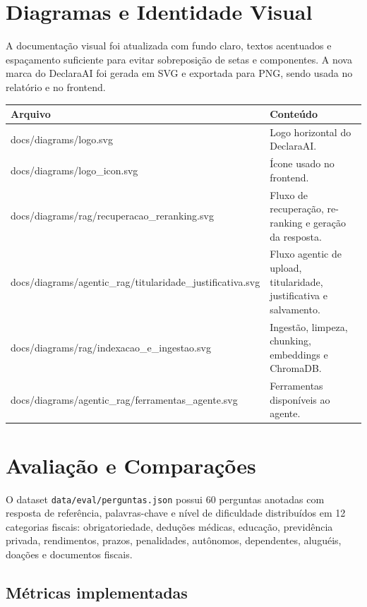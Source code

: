 \documentclass[11pt,a4paper,oneside]{article}
\begin{document}
\section{Diagramas e Identidade Visual}

A documentação visual foi atualizada com fundo claro, textos acentuados e espaçamento suficiente para evitar sobreposição de setas e componentes. A nova marca do DeclaraAI foi gerada em SVG e exportada para PNG, sendo usada no relatório e no frontend.

\begin{center}
\begin{tabularx}{\textwidth}{@{}>{\raggedright\arraybackslash\ttfamily\scriptsize}p{92mm}Y@{}}
\toprule
\textbf{Arquivo} & \textbf{Conteúdo} \\
\midrule
docs/diagrams/logo.svg & Logo horizontal do DeclaraAI. \\
docs/diagrams/logo\_icon.svg & Ícone usado no frontend. \\
docs/diagrams/rag/recuperacao\_reranking.svg & Fluxo de recuperação, re-ranking e geração da resposta. \\
docs/diagrams/agentic\_rag/titularidade\_justificativa.svg & Fluxo agentic de upload, titularidade, justificativa e salvamento. \\
docs/diagrams/rag/indexacao\_e\_ingestao.svg & Ingestão, limpeza, chunking, embeddings e ChromaDB. \\
docs/diagrams/agentic\_rag/ferramentas\_agente.svg & Ferramentas disponíveis ao agente. \\
\bottomrule
\end{tabularx}
\end{center}

\section{Avaliação e Comparações}

O dataset \texttt{data/eval/perguntas.json} possui 60 perguntas anotadas com resposta de referência, palavras-chave e nível de dificuldade distribuídos em 12 categorias fiscais: obrigatoriedade, deduções médicas, educação, previdência privada, rendimentos, prazos, penalidades, autônomos, dependentes, aluguéis, doações e documentos fiscais.

\subsection{Métricas implementadas}
\end{document}
